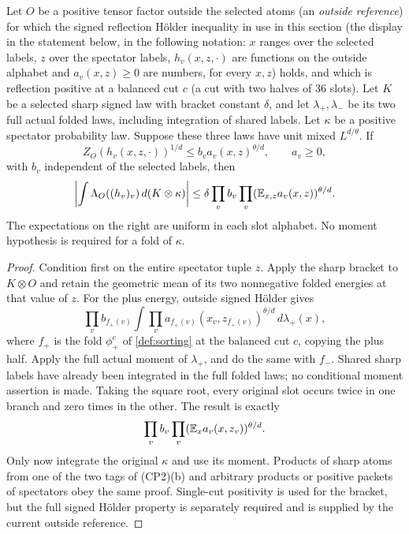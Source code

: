 \begin{lemma}\label{lem:density:coupled}
Let $O$ be a positive tensor factor outside the selected atoms
(an \emph{outside reference}) for which the signed reflection
H\"older inequality in use in this section
(the display in the statement below, in the following notation:
$x$ ranges over the selected labels, $z$ over the spectator
labels, $h_v(x,z,\cdot)$ are functions on the outside alphabet
and $a_v(x,z)\ge0$ are numbers, for every $x,z$) holds, and
which is reflection positive at a balanced cut $c$ (a cut with
two halves of $36$ slots). Let $K$ be a
selected sharp signed law with bracket constant $\delta$, and let
$\lambda_+,\lambda_-$ be its two full actual folded laws, including
integration of shared labels. Let $\kappa$ be a positive spectator
probability law. Suppose these three laws have unit mixed $L^{d/\theta}$.
If
\[
 Z_O(h_v(x,z,\cdot))^{1/d}
       \le b_v a_v(x,z)^{\theta/d},\qquad a_v\ge0,
\]
with $b_v$ independent of the selected labels, then
\[
 \left|\int\Lambda_O((h_v)_v)\,d(K\otimes\kappa)\right|
 \le\delta\prod_v b_v
          \prod_v(\mathbb E_{x,z}a_v(x,z))^{\theta/d}.
\]
The expectations on the right are uniform in each slot alphabet.
No moment hypothesis is required for a fold of $\kappa$.
\end{lemma}

\begin{proof}
Condition first on the entire spectator tuple $z$. Apply the sharp
bracket to $K\otimes O$ and retain the geometric mean of its two
nonnegative folded energies at that value of $z$. For the plus energy,
outside signed H\"older gives
\[
 \prod_v b_{f_+(v)}
 \int\prod_v
 a_{f_+(v)}(x_v,z_{f_+(v)})^{\theta/d}\,d\lambda_+(x),
\]
where $f_+$ is the fold $\phi^c_+$ of \cref{def:sorting} at the balanced cut $c$, copying the plus half. Apply the full actual
moment of $\lambda_+$, and do the same with $f_-$. Shared sharp labels
have already been integrated in the full folded laws; no conditional
moment assertion is made. Taking the square root, every original slot
occurs twice in one branch and zero times in the other. The result is
exactly
\[
 \prod_v b_v\prod_v(\mathbb E_xa_v(x,z_v))^{\theta/d}.
\]
Only now integrate the original $\kappa$ and use its moment. Products of sharp atoms from one of the two tags of (CP2)(b) and arbitrary products or positive packets
of spectators obey the same proof. Single-cut positivity is used for
the bracket, but the full signed H\"older property is separately
required and is supplied by the current outside reference.
\end{proof}

